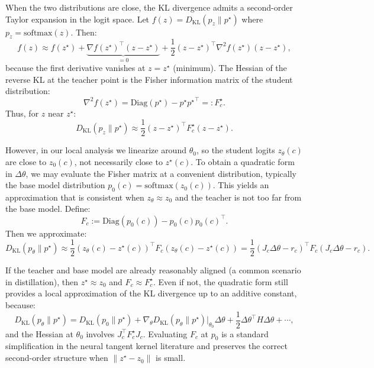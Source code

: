 \documentclass{article}
\begin{document}
When the two distributions are close, the KL divergence admits a second-order Taylor expansion in the logit space. Let \(f(z) = D_{\mathrm{KL}}(p_z\|p^{\star})\) where \(p_z = \mathrm{softmax}(z)\). Then:
\begin{equation}
f(z) \approx f(z^{\star}) + \underbrace{\nabla f(z^{\star})^{\top}(z-z^{\star})}_{=0} + \frac{1}{2}(z-z^{\star})^{\top} \nabla^2 f(z^{\star}) (z-z^{\star}),
\end{equation}
because the first derivative vanishes at \(z=z^{\star}\) (minimum). The Hessian of the reverse KL at the teacher point is the Fisher information matrix of the student distribution:
\begin{equation}
\nabla^2 f(z^{\star}) = \mathrm{Diag}(p^{\star}) - p^{\star}{p^{\star}}^{\top} =: F_c^{\star}.
\end{equation}
Thus, for \(z\) near \(z^{\star}\):
\begin{equation}
D_{\mathrm{KL}}(p_z\|p^{\star}) \approx \frac{1}{2} (z - z^{\star})^{\top} F_c^{\star} (z - z^{\star}).
\end{equation}

However, in our local analysis we linearize around \(\theta_0\), so the student logits \(z_{\theta}(c)\) are close to \(z_0(c)\), not necessarily close to \(z^{\star}(c)\). To obtain a quadratic form in \(\Delta\theta\), we may evaluate the Fisher matrix at a convenient distribution, typically the base model distribution \(p_0(c) = \mathrm{softmax}(z_0(c))\). This yields an approximation that is consistent when \(z_{\theta} \approx z_0\) and the teacher is not too far from the base model. Define:
\begin{equation}
F_c := \mathrm{Diag}(p_0(c)) - p_0(c)p_0(c)^{\top}.
\end{equation}
Then we approximate:
\begin{equation}
D_{\mathrm{KL}}(p_{\theta}\|p^{\star}) \approx \frac{1}{2} (z_{\theta}(c) - z^{\star}(c))^{\top} F_c (z_{\theta}(c) - z^{\star}(c))
= \frac{1}{2} (J_c\Delta\theta - r_c)^{\top} F_c (J_c\Delta\theta - r_c).
\end{equation}

If the teacher and base model are already reasonably aligned (a common scenario in distillation), then \(z^{\star} \approx z_0\) and \(F_c \approx F_c^{\star}\). Even if not, the quadratic form still provides a local approximation of the KL divergence up to an additive constant, because:
\begin{equation}
D_{\mathrm{KL}}(p_{\theta}\|p^{\star}) = D_{\mathrm{KL}}(p_0\|p^{\star}) + \nabla_{\theta}D_{\mathrm{KL}}(p_{\theta}\|p^{\star})|_{\theta_0} \Delta\theta + \frac{1}{2}\Delta\theta^{\top} H \Delta\theta + \cdots,
\end{equation}
and the Hessian at \(\theta_0\) involves \(J_c^{\top} F_c^{\star} J_c\). Evaluating \(F_c\) at \(p_0\) is a standard simplification in the neural tangent kernel literature and preserves the correct second-order structure when \(\|z^{\star}-z_0\|\) is small.
\end{document}
